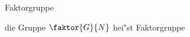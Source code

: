 \documentclass[class=article, crop=false]{standalone}
\begin{document}
\begin{zettel}{Faktorgruppe}
\begin{flashcard}
    \begin{definition}[Faktorgruppe]
        die Gruppe $\faktor{G}{N}$ hei"st Faktorgruppe
    \end{definition}
\end{flashcard}
\end{zettel}
\end{document}
